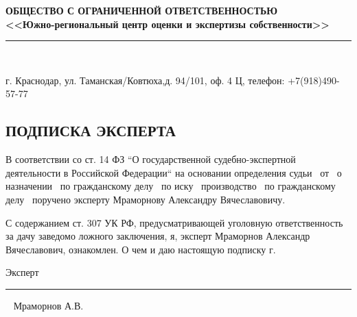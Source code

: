 \setcounter{page}{1}
\pagestyle{empty} %

%
%
\begin{center}
	\large\textbf{ОБЩЕСТВО С ОГРАНИЧЕННОЙ ОТВЕТСТВЕННОСТЬЮ \\[-1.5mm] <<Южно-региональный   центр оценки и экспертизы собственности>> \\[-5mm]}
	\noindent\rule{\textwidth}{1pt}\\[-6mm]  %
\end{center}

\begin{center}
	\begin{footnotesize}
		\vspace{-3.5mm}г. Краснодар, ул. Таманская/Ковтюха,д. 94/101, оф. 4 Ц, 
		телефон:  +7(918)490-57-77\\[5mm]
	\end{footnotesize}	
\end{center}


\vspace{20mm}

\begin{center}
	\section{{\Large \textbf{ПОДПИСКА      ЭКСПЕРТА}}}
\end{center}






В соответствии со ст. 14  ФЗ “О государственной судебно-экспертной деятельности в Российской Федерации“ на основании определения судьи \sud \,  от \dataopr  \, о назначении \opr \, по гражданскому делу \delonum \, по иску \isk \,  производство \opr \, по гражданскому делу \delonum \, поручено эксперту   Мраморнову Александру Вячеславовичу. 

\vspace{5mm}

С содержанием ст. 307 УК РФ, предусматривающей уголовную ответственность за дачу заведомо ложного заключения, я, эксперт Мраморнов Александр Вячеславович, ознакомлен.  О  чем и даю настоящую подписку \datastart г.





\vspace{30mm}

{Эксперт}\hfill      \rule{4cm}{0.1 mm} \,\,\,      {Мраморнов А.В.}